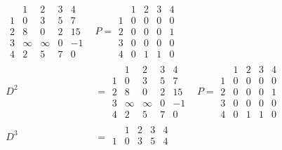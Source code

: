 \documentclass{article}
\begin{document}
\begin{multicols*}{2}
\begin{align*}
\begin{array}{c|cccc}
                      & 1      & 2      & 3 & 4  \\
                    \hline
                    1 & 0      & 3      & 5 & 7  \\
                    2 & 8      & 0      & 2 & 15 \\
                    3 & \infty & \infty & 0 & -1 \\
                    4 & 2      & 5      & 7 & 0
                \end{array}
            & P = \begin{array}{c|cccc}
                        & 1 & 2 & 3 & 4 \\
                      \hline
                      1 & 0 & 0 & 0 & 0 \\
                      2 & 0 & 0 & 0 & 1 \\
                      3 & 0 & 0 & 0 & 0 \\
                      4 & 0 & 1 & 1 & 0
                  \end{array}                \\
        D^2 & = \begin{array}{c|cccc}
                      & 1      & 2      & 3 & 4  \\
                    \hline
                    1 & 0      & 3      & 5 & 7  \\
                    2 & 8      & 0      & 2 & 15 \\
                    3 & \infty & \infty & 0 & -1 \\
                    4 & 2      & 5      & 7 & 0
                \end{array}
            & P = \begin{array}{c|cccc}
                        & 1 & 2 & 3 & 4 \\
                      \hline
                      1 & 0 & 0 & 0 & 0 \\
                      2 & 0 & 0 & 0 & 1 \\
                      3 & 0 & 0 & 0 & 0 \\
                      4 & 0 & 1 & 1 & 0
                  \end{array}                \\
        D^3 & = \begin{array}{c|cccc}
                      & 1      & 2      & 3 & 4  \\
                    \hline
                    1 & 0      & 3      & 5 & 4  \\

\end{array}
\end{align*}
\end{multicols*}
\end{document}
